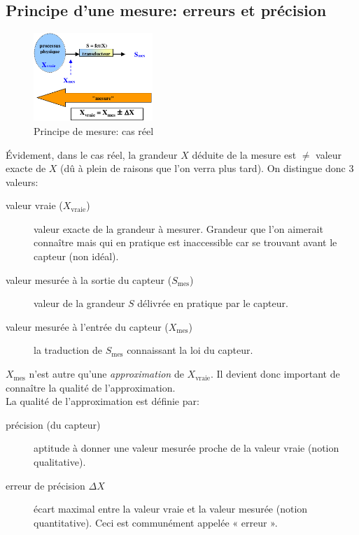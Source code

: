 \subsection{Principe d'une mesure: erreurs et précision}
\begin{figure}[H] 
	\centering 
	\includegraphics[width=0.4\textwidth]{ch2/image4}
	\caption{Principe de mesure: cas réel} 
\end{figure}
Évidement, dans le cas réel, la grandeur \(X\) déduite de la mesure est \(\neq\) valeur exacte de \(X\) (dû à plein de raisons que l'on verra plus tard). On distingue donc 3 valeurs:
\begin{description}
	\item[valeur vraie (\(X_{\text{vraie}}\))] valeur exacte de la grandeur à mesurer. Grandeur que l'on aimerait connaître mais qui en pratique est inaccessible car se trouvant avant le capteur (non idéal).
	\item[valeur mesurée à la sortie du capteur (\(S_{\text{mes}}\))] valeur de la grandeur \(S\) délivrée en pratique par le capteur.
	\item[valeur mesurée à l'entrée du capteur (\(X_{\text{mes}}\))] la traduction de \(S_{\text{mes}}\) connaissant la loi du capteur.
\end{description} 
\(X_{\text{mes}}\) n'est autre qu'une \emph{approximation} de \(X_{\text{vraie}}\). Il devient donc important de connaître la qualité de l'approximation.\\

La qualité de l'approximation est définie par:
\begin{description}
	\item[précision (du capteur)] aptitude à donner une valeur mesurée proche de la valeur vraie (notion qualitative).
	\item[erreur de précision \(\Delta X\)] écart maximal entre la valeur vraie et la valeur mesurée (notion quantitative). Ceci est communément appelée « erreur ».
\end{description}
